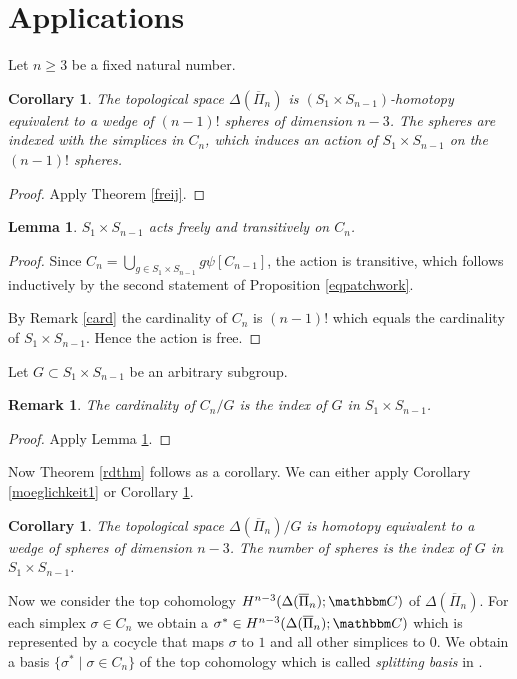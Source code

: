 \documentclass{elsarticle}
\newtheorem{lem}[df]{Lemma}
\newtheorem{cor}[df]{Corollary}
\newtheorem{rem}[df]{Remark}
\def\C{\mathbbm C}
\begin{document}
\section{Applications}
Let $n\geq 3$ be a fixed natural number.
\begin{cor}
\label{moeglichkeit2}
The topological space $\Delta(\overline{\Pi}_n)$ is $(S_1\times S_{n-1})$-homotopy equivalent to a wedge of $(n-1)!$ spheres of dimension $n-3$. The spheres are indexed with the simplices in $C_n$, which induces an action of $S_1\times S_{n-1}$ on the $(n-1)!$ spheres.
\end{cor}
\begin{proof}
Apply Theorem \ref{freij}.
\end{proof}
\begin{lem}
\label{freetrans}
$S_1\times S_{n-1}$ acts freely and transitively on $C_n$.
\end{lem}
\begin{proof}
Since $C_n=\bigcup_{g\in S_1\times S_{n-1}}g\psi[C_{n-1}]$, the action is transitive, which follows inductively by the second statement of Proposition \ref{eqpatchwork}.

By Remark \ref{card} the cardinality of $C_n$ is $(n-1)!$ which equals the cardinality of $S_1\times S_{n-1}$. Hence the action is free.
\end{proof}
Let $G\subset S_1\times S_{n-1}$ be an arbitrary subgroup.
\begin{rem}
The cardinality of $C_n/G$ is the index of $G$ in $S_1\times S_{n-1}$.
\end{rem}
\begin{proof}
Apply Lemma \ref{freetrans}.
\end{proof}
Now Theorem \ref{rdthm} follows as a corollary. We can either apply Corollary \ref{moeglichkeit1} or Corollary \ref{moeglichkeit2}.
\begin{cor}
The topological space $\Delta(\overline{\Pi}_n)/G$ is homotopy equivalent to a wedge of spheres of dimension $n-3$. The number of spheres is the index of $G$ in $S_1\times S_{n-1}$.
\end{cor}
Now we consider the top cohomology $H^{n-3}(\Delta(\overline{\Pi}_n);\C)$ of $\Delta(\overline{\Pi}_n)$. For each simplex $\sigma\in C_n$ we obtain a $\sigma^*\in H^{n-3}(\Delta(\overline{\Pi}_n);\C)$ which is represented by a cocycle that maps $\sigma$ to $1$ and all other simplices to $0$. We obtain a basis $\{\sigma^*\mid\sigma\in C_n\}$ of the top cohomology which is called \emph{splitting basis} in \cite{wachs}.
\end{document}

